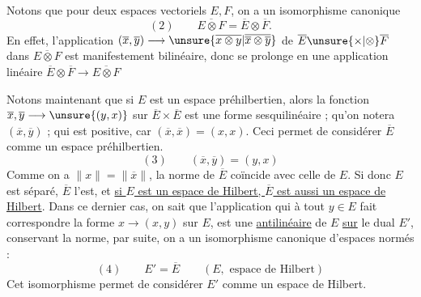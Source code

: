 Notons que pour deux espaces vectoriels $E,F$, on a un isomorphisme canonique
\[
(2)\qquad\overline{E\otimes F}=\overline E\otimes\overline F.
\]
En effet, l'application $(\overline x,\overline y)\longrightarrow\unsure{\overline{x\otimes y}|\overline{\overline x\otimes\overline y}}$ de $\overline E\unsure{\times|\otimes}\overline F$ dans $\overline{E\otimes F}$ est manifestement bilinéaire, donc se prolonge en une application linéaire $\overline E\otimes\overline F\longrightarrow\overline{E\otimes F}$

Notons maintenant que si $E$ est un espace préhilbertien, alors la fonction $\overline x,\overline y\longrightarrow\unsure{(y,x)}$ sur $\overline E\times\overline E$ est une forme sesquilinéaire ; qu'on notera $(\overline x,\overline y)$ ; qui  est   positive, car $(\overline x,\overline x)=(x,x)$.
Ceci permet de considérer $\overline E$ comme un espace préhilbertien.
\[
(3)\qquad(\overline x,\overline y)=(y,x)
\]
Comme on a $\|x\|=\|\overline x\|$, la norme de $\overline E$ coïncide avec celle de $E$. Si donc $E$ est séparé, $\overline E$ l'est, et \uline{si $E$ est un espace de Hilbert, $\overline E$ est aussi un espace de Hilbert}.
Dans ce dernier cas, on sait que l'application qui à tout $y\in E$ fait correspondre la forme $x\longrightarrow(x,y)$ sur $E$, est une   \uline{antilinéaire} de $E$ \uline{sur} le dual $E'$, conservant la norme, par suite, on a   un isomorphisme canonique d'espaces normés :
\[
(4)\qquad E'=\overline E\qquad(E,\text{ espace de Hilbert})
\]
Cet isomorphisme permet de considérer $E'$ comme   un espace de Hilbert.
